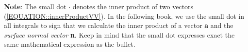 \documentclass[MathematicsNumericsDerivationsAndOpenFOAM.tex]{subfiles}
\begin{document}
	\textbf{Note}: The small dot $\cdot$  denotes the inner product of two
    vectors (\ref{EQUATION::innerProductVV}). In the following book, we use
    the small dot in all integrals to sign that we calculate the inner product
    of a vector \textbf{a} and the \textit{surface normal vector} \textbf{n}.
    Keep in mind that the small dot expresses exact the same mathematical
    expression as the bullet.


\end{document}
